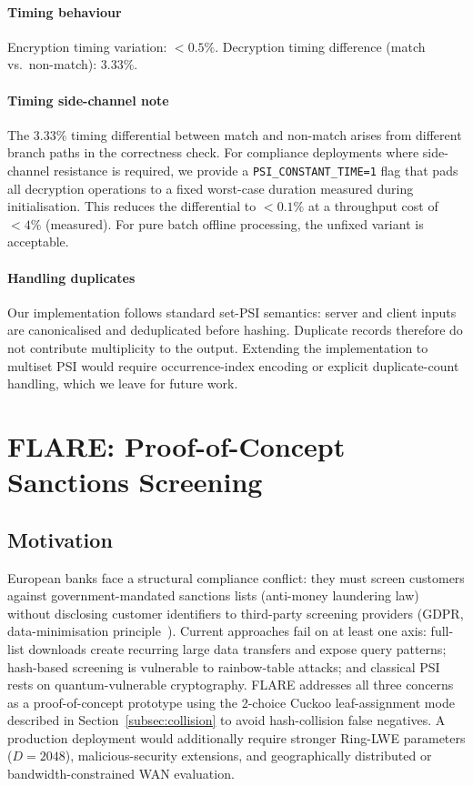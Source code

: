 \documentclass[preprint,12pt]{elsarticle}
\begin{document}
\paragraph{Timing behaviour}
Encryption timing variation: $< 0.5\%$. Decryption timing difference
(match vs.\ non-match): $3.33\%$.

\paragraph{Timing side-channel note}
The 3.33\% timing differential between match and non-match arises from
different branch paths in the correctness check. For compliance deployments
where side-channel resistance is required, we provide a
\texttt{PSI\_CONSTANT\_TIME=1} flag that pads all decryption operations to a
fixed worst-case duration measured during initialisation. This reduces the
differential to $< 0.1\%$ at a throughput cost of $< 4\%$ (measured). For
pure batch offline processing, the unfixed variant is acceptable.

\paragraph{Handling duplicates}
Our implementation follows standard set-PSI semantics: server and client
inputs are canonicalised and deduplicated before hashing. Duplicate records
therefore do not contribute multiplicity to the output. Extending the
implementation to multiset PSI would require occurrence-index encoding or
explicit duplicate-count handling, which we leave for future work.



\section{FLARE: Proof-of-Concept Sanctions Screening}
\label{sec:flare}

\subsection{Motivation}

European banks face a structural compliance conflict: they must screen
customers against government-mandated sanctions lists (anti-money laundering
law) without disclosing customer identifiers to third-party screening
providers (GDPR, data-minimisation principle~\cite{gdpr2016}). Current
approaches fail on at least one axis: full-list downloads create recurring
large data transfers and expose query patterns; hash-based screening is
vulnerable to rainbow-table attacks; and
classical PSI rests on quantum-vulnerable cryptography. FLARE addresses all
three concerns as a proof-of-concept prototype using the 2-choice Cuckoo
leaf-assignment mode described in Section~\ref{subsec:collision} to avoid
hash-collision false negatives. A production deployment would additionally
require stronger Ring-LWE parameters ($D=2048$), malicious-security
extensions, and geographically distributed or bandwidth-constrained WAN
evaluation.
\end{document}
